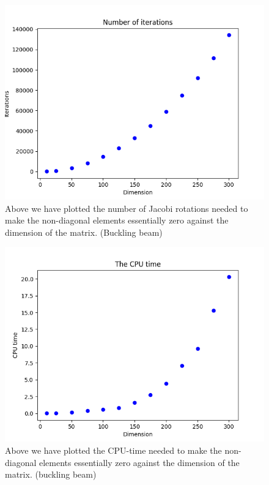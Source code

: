 \documentclass[norsk,a4paper,12pt]{article}
\begin{document}
\begin{figure}[H]
	\centering
	\includegraphics[width=\linewidth]{Iterasjoner.png}
	\caption{Above we have plotted the number of Jacobi rotations needed to make the non-diagonal elements essentially zero against the dimension of the matrix. (Buckling beam)}
	\label{fig:iter}
\end{figure}

\begin{figure}[H]
	\centering
	\includegraphics[width=\linewidth]{CPU_tid.png}
	\caption{Above we have plotted the CPU-time needed to make the non-diagonal elements essentially zero against the dimension of the matrix. (buckling beam)}
	\label{fig:CPU}
\end{figure}
\end{document}
